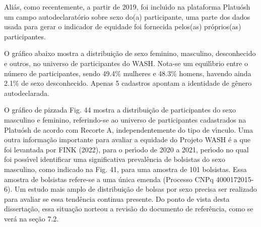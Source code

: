 \documentclass[
12pt,		%
openright,	%
twoside,  %
a4paper,			%
chapter=TITLE,		%
english,			%
french,				%
spanish,			%
brazil				%
]{USPSC-classe/USPSC}
\begin{document}
Ali\'as, como recentemente, a partir de 2019, foi inclu\'{\i}do na plataforma Platu\'osh um campo autodeclarat\'orio sobre sexo do(a) participante, uma parte dos dados usada para gerar o indicador de equidade foi fornecida pelos(as) pr\'oprios(as) participantes.








O gr\'afico abaixo mostra a distribui\c{c}\~ao de sexo feminino, masculino, desconhecido e outros, no universo de participantes do WASH. Nota-se um equil\'{\i}brio entre o n\'umero de participantes, sendo 49.4\%  mulheres e 48.3\% homens, havendo ainda 2.1\% de sexo desconhecido. Apenas 5 cadastros apontam a identidade de g\^enero autodeclarada.








O gr\'afico de \textquotedbl pizza\textquotedbl  da Fig. 44 mostra a distribui\c{c}\~ao de participantes do sexo masculino e feminino, referindo-se ao universo de participantes cadastrados na Platu\'osh de acordo com Recorte A, independentemente do tipo de v\'{\i}nculo. Uma outra informa\c{c}\~ao importante para avaliar a equidade do Projeto WASH \'e a que foi levantada por  FINK (2022), para o per\'{\i}odo de 2020 a 2021, per\'{\i}odo no qual foi poss\'{\i}vel identificar uma significativa preval\^encia de bolsistas do sexo masculino, como indicado na Fig. 41, para uma amostra de 101 bolsistas. Essa amostra de bolsistas refere-se a uma \'unica emenda (Processo CNPq 4000172015-6). Um estudo mais amplo de distribui\c{c}\~ao de bolsas por sexo precisa ser realizado para avaliar se essa tend\^encia continua presente. Do ponto de vista desta disserta\c{c}\~ao, essa situa\c{c}\~ao norteou a revis\~ao do documento de refer\^encia, como se ver\'a na se\c{c}\~ao 7.2.
\end{document}
